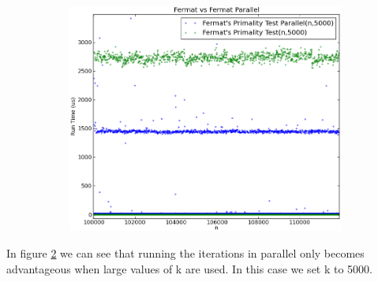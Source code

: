 \documentclass[compressed,final,notitlepage,narroweqnarray,inline,twoside,]{ieee}
\begin{document}
\begin{figure}
        \centering
        \begin{subfigure}[b]{0.5\textwidth}
                \includegraphics[width=\textwidth]{../images/FPT_FPTP_large_runtime}
                \label{fig:gull}
        \end{subfigure}
        \vspace{-30pt}\caption{}\label{fig:fermat_p_comparison_large}
\end{figure}
In figure \ref{fig:fermat_p_comparison_large}  we can see that running the iterations in parallel only becomes advantageous when large values of k are used. In this case we set k to 5000. 
\end{document}
